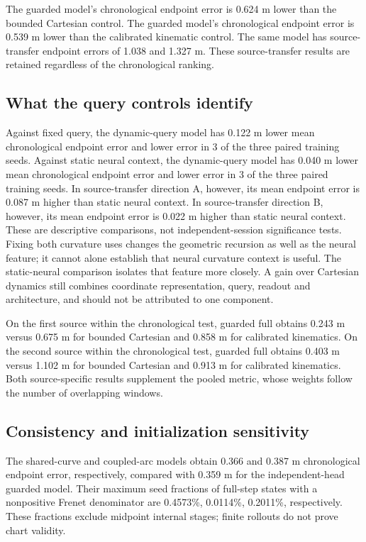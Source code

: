 \documentclass[preprint,12pt]{elsarticle}
\begin{document}
The guarded model's chronological endpoint error is 0.624 m lower than the bounded Cartesian control. The guarded model's chronological endpoint error is 0.539 m lower than the calibrated kinematic control. The same model has source-transfer endpoint errors of 1.038 and 1.327 m. These source-transfer results are retained regardless of the chronological ranking.

\subsection{What the query controls identify}
Against fixed query, the dynamic-query model has 0.122 m lower mean chronological endpoint error and lower error in 3 of the three paired training seeds. Against static neural context, the dynamic-query model has 0.040 m lower mean chronological endpoint error and lower error in 3 of the three paired training seeds. In source-transfer direction A, however, its mean endpoint error is 0.087 m higher than static neural context. In source-transfer direction B, however, its mean endpoint error is 0.022 m higher than static neural context. These are descriptive comparisons, not independent-session significance tests.
Fixing both curvature uses changes the geometric recursion as well as the
neural feature; it cannot alone establish that neural curvature context is
useful. The static-neural comparison isolates that feature more closely.
A gain over Cartesian dynamics still combines coordinate representation,
query, readout and architecture, and should not be attributed to one component.

On the first source within the chronological test, guarded full obtains 0.243 m versus 0.675 m for bounded Cartesian and 0.858 m for calibrated kinematics. On the second source within the chronological test, guarded full obtains 0.403 m versus 1.102 m for bounded Cartesian and 0.913 m for calibrated kinematics. Both source-specific results supplement the pooled metric, whose weights follow the number of overlapping windows.

\subsection{Consistency and initialization sensitivity}
The shared-curve and coupled-arc models obtain 0.366 and 0.387 m chronological endpoint error, respectively, compared with 0.359 m for the independent-head guarded model. Their maximum seed fractions of full-step states with a nonpositive Frenet denominator are 0.4573\%, 0.0114\%, 0.2011\%, respectively. These fractions exclude midpoint internal stages; finite rollouts do not prove chart validity.
\end{document}

